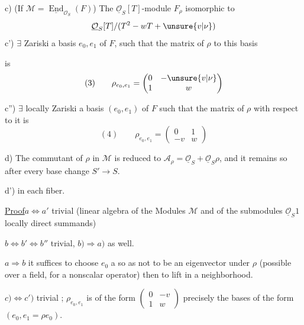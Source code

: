 c) (If $\mathcal M=\underline{\operatorname{End}}_{\mathcal O_S}(F)$) The $\underline{\mathcal O}_S[T]$-module $F_\rho$  isomorphic to
\[
\underline{\mathcal O}_S[T]/(T^2-wT+\unsure{v|\nu})
\]
c')  $\exists$  Zariski a basis $e_0,e_1$ of $F$, such that the matrix of $\rho$  to this basis


is
\[
(3)\qquad \rho_{e_0,e_1}=\begin{pmatrix}0&-\unsure{v|\nu}\\1&w\end{pmatrix}
\]

c'') 
$\exists$ locally Zariski a basis $(e_0,e_1)$ of $F$ such that the matrix of $\rho$ with respect to it is
\[
(4)\qquad \rho_{e_0,e_1}=\begin{pmatrix}0&1\\-v&w\end{pmatrix}
\]

d) The commutant of $\rho$ in $\mathcal M$ is reduced to
$\mathcal A_\rho=\underline{\mathcal O}_S+\underline{\mathcal O}_S\rho$, and it remains so after every base change $S'\to S$.

d')  in each fiber.

\uline{Proof}\quad $a\Longleftrightarrow a'$ trivial (linear algebra of the Modules $\mathcal M$ and of the submodules $\underline{\mathcal O}_S1$ locally direct summands)

$b\Longleftrightarrow b'\Longleftrightarrow b''$ trivial, $b)\Longrightarrow a)$ as well.

$a\Longrightarrow b$ it suffices to choose $e_0$  a  so as not to be an eigenvector under $\rho$ (possible over a field, for a nonscalar operator) then to lift in a neighborhood.

$c)\Longleftrightarrow c')$ trivial ; 
$\rho_{e_0,e_1}$ is of the form $\begin{pmatrix}0&-v\\1&w\end{pmatrix}$  precisely the bases of the form $(e_0,e_1=\rho e_0)$.

